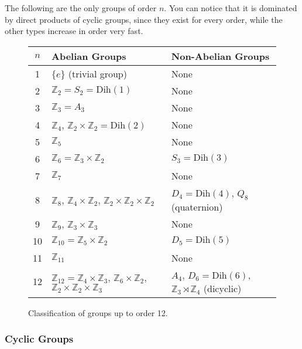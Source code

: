   \begin{theorem}
    The following are the only groups of order $n$. You can notice that it is dominated by direct products of cyclic groups, since they exist for every order, while the other types increase in order very fast.   

    \begin{figure}[H]
      \centering
      \begin{tabular}{|c|l|l|}
      \hline
      $n$ & \textbf{Abelian Groups} & \textbf{Non-Abelian Groups} \\
      \hline
      1 & $\{e\}$ (trivial group) & None \\
      \hline
      2 & $\mathbb{Z}_2 = S_2 = \text{Dih}(1)$ & None \\
      \hline
      3 & $\mathbb{Z}_3 = A_3$ & None \\
      \hline
      4 & $\mathbb{Z}_4$, $\mathbb{Z}_2 \times \mathbb{Z}_2 = \text{Dih}(2)$ & None \\
      \hline
      5 & $\mathbb{Z}_5$ & None \\
      \hline
      6 & $\mathbb{Z}_6 = \mathbb{Z}_3 \times \mathbb{Z}_2$ & $S_3 = \text{Dih}(3)$ \\
      \hline
      7 & $\mathbb{Z}_7$ & None \\
      \hline
      8 & $\mathbb{Z}_8$, $\mathbb{Z}_4 \times \mathbb{Z}_2$, $\mathbb{Z}_2 \times \mathbb{Z}_2 \times \mathbb{Z}_2$ & $D_4 = \text{Dih}(4)$, $Q_8$ (quaternion) \\
      \hline
      9 & $\mathbb{Z}_9$, $\mathbb{Z}_3 \times \mathbb{Z}_3$ & None \\
      \hline
      10 & $\mathbb{Z}_{10} = \mathbb{Z}_5 \times \mathbb{Z}_2$ & $D_5 = \text{Dih}(5)$ \\
      \hline
      11 & $\mathbb{Z}_{11}$ & None \\
      \hline
      12 & $\mathbb{Z}_{12} = \mathbb{Z}_4 \times \mathbb{Z}_3$, $\mathbb{Z}_6 \times \mathbb{Z}_2$, $\mathbb{Z}_2 \times \mathbb{Z}_2 \times \mathbb{Z}_3$ & $A_4$, $D_6 = \text{Dih}(6)$, $\mathbb{Z}_3 \rtimes \mathbb{Z}_4$ (dicyclic) \\
      \hline
      \end{tabular}
      \caption{Classification of groups up to order 12.}
      \label{tab:groups_up_to_order_10}
    \end{figure}
  \end{theorem}

\subsubsection{Cyclic Groups}

